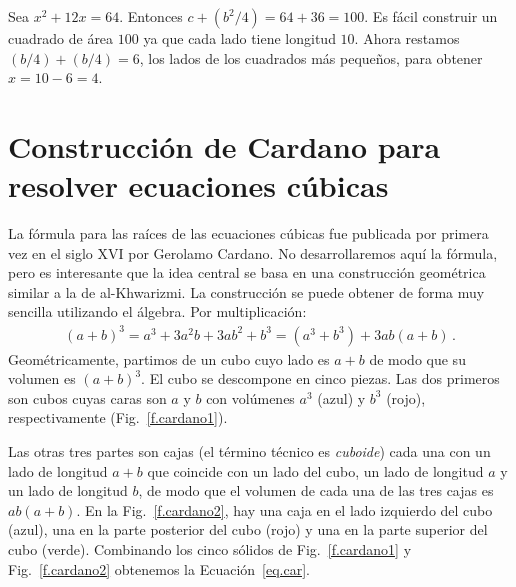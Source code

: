 \begin{example}
Sea $x^2+12x=64$. Entonces $c+(b^2/4)=64+36=100$. Es fácil construir un cuadrado de área $100$ ya que cada lado tiene longitud $10$. Ahora restamos $(b/4)+(b/4)=6$, los lados de los cuadrados más pequeños, para obtener $x=10-6=4$.
\end{example}

\section{Construcción de Cardano para resolver ecuaciones cúbicas}\label{s.cardano}

La fórmula para las raíces de las ecuaciones cúbicas fue publicada por primera vez en el siglo XVI por Gerolamo Cardano. No desarrollaremos aquí la fórmula, pero es interesante que la idea central se basa en una construcción geométrica similar a la de al-Khwarizmi. La construcción se puede obtener de forma muy sencilla utilizando el álgebra. Por multiplicación:
\begin{align}\label{eq.car}
(a+b)^3=a^3+3a^2b+3ab^2+b^3=(a^3+b^3)+3ab(a+b)\,.
\end{align}
Geométricamente, partimos de un cubo cuyo lado es $a+b$ de modo que su volumen es $(a+b)^3$. El cubo se descompone en cinco piezas. Las dos primeros son cubos cuyas caras son $a$ y $b$ con volúmenes $a^3$ (azul) y $b^3$ (rojo), respectivamente (Fig.~\ref{f.cardano1}).

Las otras tres partes son cajas (el término técnico es \emph{cuboide}) cada una con un lado de longitud $a+b$ que coincide con un lado del cubo, un lado de longitud $a$ y un lado de longitud $b$, de modo que el volumen de cada una de las tres cajas es $ab(a+b)$. En la Fig.~\ref{f.cardano2}, hay una caja en el lado izquierdo del cubo (azul), una en la parte posterior del cubo (rojo) y una en la parte superior del cubo (verde).
Combinando los cinco sólidos de Fig.~\ref{f.cardano1} y Fig.~\ref{f.cardano2} obtenemos la Ecuación~\ref{eq.car}.

